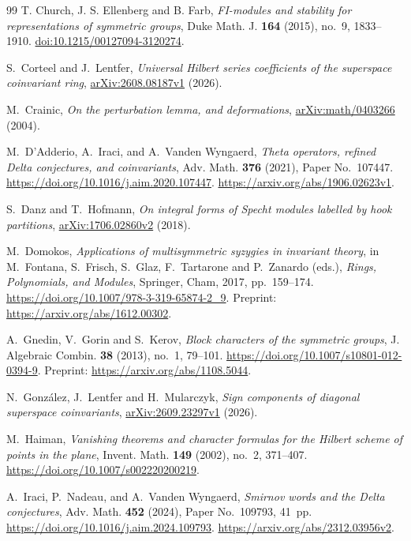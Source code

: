 \begin{thebibliography}{99}
T. Church, J. S. Ellenberg and B. Farb,
\emph{FI-modules and stability for representations of symmetric groups},
Duke Math. J. \textbf{164} (2015), no.~9, 1833--1910.
\href{https://doi.org/10.1215/00127094-3120274}{doi:10.1215/00127094-3120274}.

S.~Corteel and J.~Lentfer,
\emph{Universal Hilbert series coefficients of the
superspace coinvariant ring},
\href{https://arxiv.org/abs/2608.08187v1}{arXiv:\allowbreak 2608.08187v1} (2026).

M.~Crainic, \emph{On the perturbation lemma, and deformations},
\href{https://arxiv.org/abs/math/0403266}{arXiv:math/0403266} (2004).

M.~D'Adderio, A.~Iraci, and A.~Vanden Wyngaerd,
\emph{Theta operators, refined Delta conjectures, and coinvariants},
Adv. Math. \textbf{376} (2021), Paper No.~107447.
\url{https://doi.org/10.1016/j.aim.2020.107447}.
\url{https://arxiv.org/abs/1906.02623v1}.

S.~Danz and T.~Hofmann,
\emph{On integral forms of Specht modules labelled by hook partitions},
\href{https://arxiv.org/abs/1706.02860v2}{arXiv:\allowbreak 1706.02860v2} (2018).

M.~Domokos,
\emph{Applications of multisymmetric syzygies in invariant theory},
in M.~Fontana, S.~Frisch, S.~Glaz, F.~Tartarone and P.~Zanardo (eds.),
\emph{Rings, Polynomials, and Modules},
Springer, Cham, 2017, pp.~159--174.
\url{https://doi.org/10.1007/978-3-319-65874-2_9}.
Preprint: \url{https://arxiv.org/abs/1612.00302}.

A.~Gnedin, V.~Gorin and S.~Kerov,
\emph{Block characters of the symmetric groups},
J. Algebraic Combin. \textbf{38} (2013), no.~1, 79--101.
\url{https://doi.org/10.1007/s10801-012-0394-9}.
Preprint: \url{https://arxiv.org/abs/1108.5044}.

N.~Gonz\'alez, J.~Lentfer and H.~Mularczyk,
\emph{Sign components of diagonal superspace coinvariants},
\href{https://arxiv.org/abs/2609.23297v1}{arXiv:\allowbreak 2609.23297v1} (2026).

M.~Haiman,
\emph{Vanishing theorems and character formulas for the
Hilbert scheme of points in the plane},
Invent. Math. \textbf{149} (2002), no.~2, 371--407.
\url{https://doi.org/10.1007/s002220200219}.

A.~Iraci, P.~Nadeau, and A.~Vanden Wyngaerd,
\emph{Smirnov words and the Delta conjectures},
Adv. Math. \textbf{452} (2024), Paper No.~109793, 41~pp.
\url{https://doi.org/10.1016/j.aim.2024.109793}.
\url{https://arxiv.org/abs/2312.03956v2}.


\end{thebibliography}
